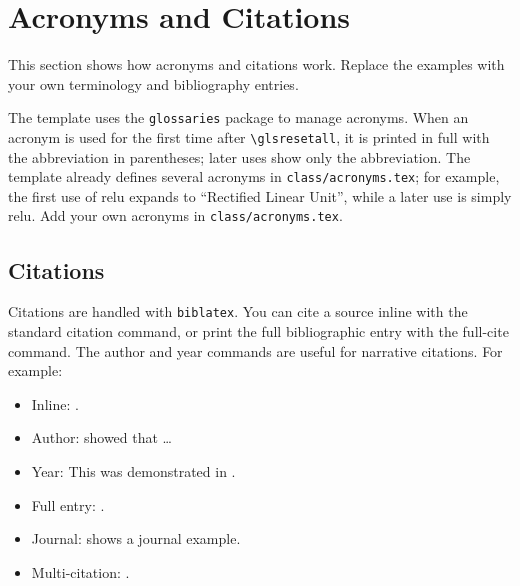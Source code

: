 \section{Acronyms and Citations}\label{ch3sec:acronyms-citations}

This section shows how acronyms and citations work. Replace the examples with your own terminology and bibliography entries.

The template uses the \texttt{glossaries} package to manage acronyms. When an acronym is used for the first time after \verb|\glsresetall|, it is printed in full with the abbreviation in parentheses; later uses show only the abbreviation. The template already defines several acronyms in \texttt{class/acronyms.tex}; for example, the first use of \gls{relu} expands to ``Rectified Linear Unit'', while a later use is simply \gls{relu}. Add your own acronyms in \texttt{class/acronyms.tex}.

\begin{figure}[ht]
\centering
{}
\label{ch3fig:exp-setup}
\end{figure}

\subsection{Citations}

Citations are handled with \texttt{biblatex}. You can cite a source inline with the standard citation command, or print the full bibliographic entry with the full-cite command. The author and year commands are useful for narrative citations. For example:

\begin{itemize}
\item Inline: \cite{placeholder2024demo}.
\item Author: \citeauthor{placeholder2024template} showed that \ldots
\item Year: This was demonstrated in \citeyear{placeholder2024template}.
\item Full entry: .
\item Journal: \cite{placeholder2023journal} shows a journal example.
\item Multi-citation: \cite{placeholder2024demo, placeholder2024template, placeholder2023journal}.
\end{itemize}

